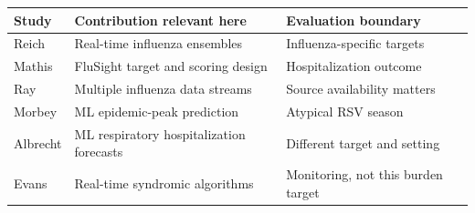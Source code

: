 \par\noindent\begin{minipage}{\columnwidth}
\label{tab:prior}\centering\footnotesize
\begin{tabularx}{\columnwidth}{@{}p{}YY@{}}
\toprule
Study & Contribution relevant here & Evaluation boundary\\
\midrule
Reich \cite{reich} & Real-time influenza ensembles & Influenza-specific targets\\
Mathis \cite{mathis} & FluSight target and scoring design & Hospitalization outcome\\
Ray \cite{ray} & Multiple influenza data streams & Source availability matters\\
Morbey \cite{morbey} & ML epidemic-peak prediction & Atypical RSV season\\
Albrecht \cite{albrecht} & ML respiratory hospitalization forecasts & Different target and setting\\
Evans \cite{evans} & Real-time syndromic algorithms & Monitoring, not this burden target\\
\bottomrule
\end{tabularx}
\end{minipage}
\par\smallskip
